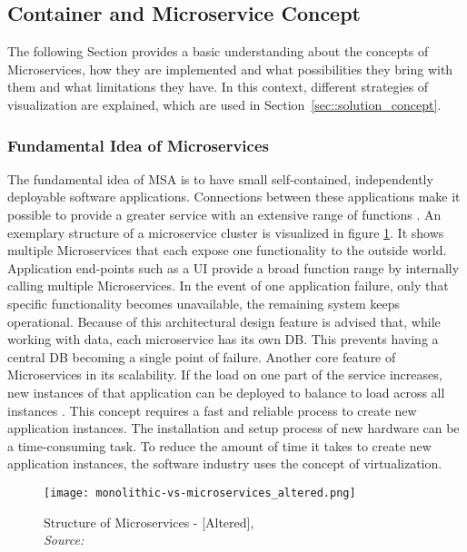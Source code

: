 \documentclass[12pt, a4paper]{article}
\begin{document}
    \subsection{Container and Microservice Concept}\label{ssec::microservices}
    The following Section provides a basic understanding about the concepts of Microservices, how they are implemented and what possibilities they bring with them and what limitations they have. In this context, different strategies of visualization are explained, which are used in Section~\ref{sec::solution_concept}.

        \subsubsection{Fundamental Idea of Microservices}
        The fundamental idea of \ac{MSA} is to have small self-contained, independently deployable software applications. Connections between these applications make it possible to provide a greater service with an extensive range of functions \cite{micro}. An exemplary structure of a microservice cluster is visualized in figure \ref{fig::micro}. It shows multiple Microservices that each expose one functionality to the outside world. Application end-points such as a \ac{UI} provide a broad function range by internally calling multiple Microservices. In the event of one application failure, only that specific functionality becomes unavailable, the remaining system keeps operational. Because of this architectural design feature is advised that, while working with data, each microservice has its own \ac{DB}. This prevents having a central \acl{DB} becoming a single point of failure. Another core feature of Microservices in its scalability. If the load on one part of the service increases, new instances of that application can be deployed to balance to load across all instances \cite{micro}. This concept requires a fast and reliable process to create new application instances.\newline
        The installation and setup process of new hardware can be a time-consuming task. To reduce the amount of time it takes to create new application instances, the software industry uses the concept of virtualization.

        \begin{figure}
            \centering
            \texttt{[image: monolithic-vs-microservices\_altered.png]}
            \caption{Structure of Microservices - [Altered], \\\textit{Source:~\cite{redhat_micro}}}\label{fig::micro}
        \end{figure}
\end{document}
